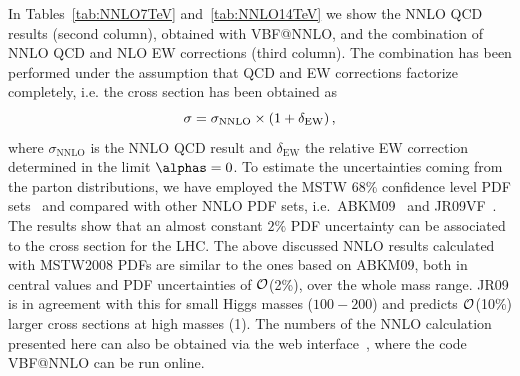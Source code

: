 \begin{sloppy}
In Tables~\ref{tab:NNLO7TeV} and~\ref{tab:NNLO14TeV} we show the NNLO QCD
results (second column), obtained with {\sc VBF@NNLO}, and the combination of
NNLO QCD and NLO EW corrections (third column).  The combination has been
performed under the assumption that QCD and EW corrections factorize
completely, i.e. the cross section has been obtained as
\begin{equation}
\sigma = \sigma_{\rm NNLO}\times (1 + \delta_{\rm EW})\,,
\end{equation} 
where $\sigma_{\mathrm{NNLO}}$ is the NNLO QCD result and
$\delta_{\mathrm{EW}}$ the relative EW correction determined in the limit
$\alphas=0$.
%
To estimate the uncertainties coming from the parton distributions, we have
employed the MSTW $68\%$ confidence level PDF sets~\cite{Martin:2009iq} and
compared with other NNLO PDF sets, i.e.\ ABKM09~\cite{Alekhin:2009ni} and
JR09VF~\cite{JimenezDelgado:2009tv}. The results show that an almost constant
$2\%$ PDF uncertainty can be associated to the cross section for the LHC.
The above discussed NNLO results calculated with MSTW2008 PDFs are similar
to the ones based on ABKM09, both in 
central values and PDF uncertainties of $\cal{O}$(2\%), over the whole mass
range.  
JR09 is in agreement with this for small Higgs masses ($100{-}200$\UGeV)
and predicts $\cal{O}$(10\%) larger cross sections at high masses (1\UTeV).
The numbers of the NNLO calculation presented here can also be obtained via
the web interface~\cite{WebInterface:2010}, where the code {\sc VBF@NNLO} can
be run online.
\end{sloppy}

\clearpage
